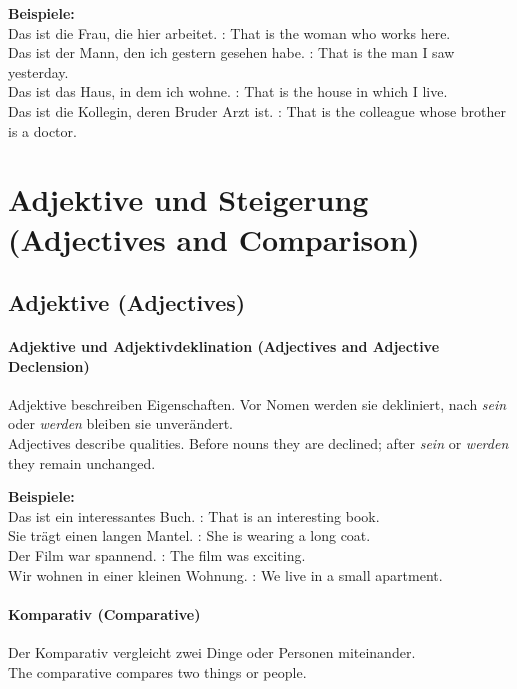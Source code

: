 \documentclass[a4paper]{article}
\begin{document}
            \textbf{Beispiele:}\\
            Das ist die Frau, die hier arbeitet. : That is the woman who works here.\\
            Das ist der Mann, den ich gestern gesehen habe. : That is the man I saw yesterday.\\
            Das ist das Haus, in dem ich wohne. : That is the house in which I live.\\
            Das ist die Kollegin, deren Bruder Arzt ist. : That is the colleague whose brother is a doctor.
    
    
    \section{Adjektive und Steigerung {\small (Adjectives and Comparison)}}
    
    \subsection{Adjektive {\small (Adjectives)}}
        
        \paragraph{Adjektive und Adjektivdeklination {\small (Adjectives and Adjective Declension)}}
            Adjektive beschreiben Eigenschaften. Vor Nomen werden sie dekliniert, nach \textit{sein} oder \textit{werden} bleiben sie unverändert.\\
            Adjectives describe qualities. Before nouns they are declined; after \textit{sein} or \textit{werden} they remain unchanged.
            
            \textbf{Beispiele:}\\
            Das ist ein interessantes Buch. : That is an interesting book.\\
            Sie trägt einen langen Mantel. : She is wearing a long coat.\\
            Der Film war spannend. : The film was exciting.\\
            Wir wohnen in einer kleinen Wohnung. : We live in a small apartment.
        
        \paragraph{Komparativ {\small (Comparative)}}
            Der Komparativ vergleicht zwei Dinge oder Personen miteinander.\\
            The comparative compares two things or people.
            
\end{document}
